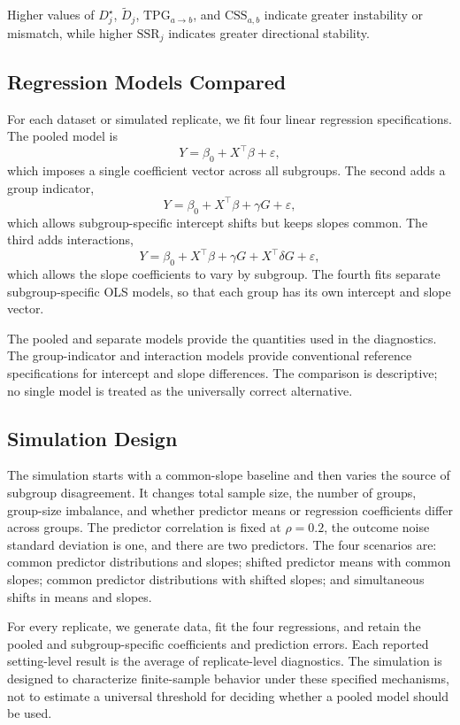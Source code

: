 Higher values of $D_j^{\star}$, $\widetilde{D}_j$, $\mathrm{TPG}_{a \to b}$, and $\mathrm{CSS}_{a,b}$ indicate greater instability or mismatch, while higher $\mathrm{SSR}_j$ indicates greater directional stability.

\subsection{Regression Models Compared}

For each dataset or simulated replicate, we fit four linear regression specifications. The pooled model is
\[
Y = \beta_0 + X^\top \beta + \varepsilon,
\]
which imposes a single coefficient vector across all subgroups. The second adds a group indicator,
\[
Y = \beta_0 + X^\top \beta + \gamma G + \varepsilon,
\]
which allows subgroup-specific intercept shifts but keeps slopes common. The third adds interactions,
\[
Y = \beta_0 + X^\top \beta + \gamma G + X^\top \delta G + \varepsilon,
\]
which allows the slope coefficients to vary by subgroup. The fourth fits separate subgroup-specific OLS models, so that each group has its own intercept and slope vector.

The pooled and separate models provide the quantities used in the diagnostics. The group-indicator and interaction models provide conventional reference specifications for intercept and slope differences. The comparison is descriptive; no single model is treated as the universally correct alternative.

\subsection{Simulation Design}

The simulation starts with a common-slope baseline and then varies the source of subgroup disagreement. It changes total sample size, the number of groups, group-size imbalance, and whether predictor means or regression coefficients differ across groups. The predictor correlation is fixed at $\rho=0.2$, the outcome noise standard deviation is one, and there are two predictors. The four scenarios are: common predictor distributions and slopes; shifted predictor means with common slopes; common predictor distributions with shifted slopes; and simultaneous shifts in means and slopes.

For every replicate, we generate data, fit the four regressions, and retain the pooled and subgroup-specific coefficients and prediction errors. Each reported setting-level result is the average of replicate-level diagnostics. The simulation is designed to characterize finite-sample behavior under these specified mechanisms, not to estimate a universal threshold for deciding whether a pooled model should be used.

